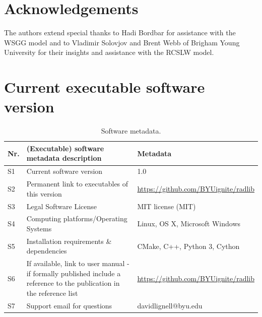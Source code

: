 \documentclass[preprint,12pt, a4paper]{elsarticle}
\begin{document}

\section*{Acknowledgements} \label{sec:acknowledgements}

The authors extend special thanks to Hadi Bordbar for assistance with the WSGG model and to Vladimir Solovjov and Brent Webb of Brigham Young University for their insights and assistance with the RCSLW model. 


 
 


\section*{Current executable software version} \label{s:current_software}


\begin{table}[!h]
\begin{tabular}{|l|p{6.5cm}|p{6.5cm}|}
\hline
\textbf{Nr.} & \textbf{(Executable) software metadata description} & \textbf{Metadata} \\
\hline
S1 & Current software version & 1.0 \\
\hline
S2 & Permanent link to executables of this version  & \href{https://github.com/BYUignite/radlib}{https://github.com/BYUignite/radlib} \\
\hline
S3 & Legal Software License & MIT license (MIT) \\
\hline
S4 & Computing platforms/Operating Systems & Linux, OS X, Microsoft Windows\\
\hline
S5 & Installation requirements \& dependencies & CMake, C++, Python 3, Cython \\
\hline
S6 & If available, link to user manual - if formally published include a reference to the publication in the reference
    list & \href{https://github.com/BYUignite/radlib}{https://github.com/BYUignite/radlib} \\
\hline
S7 & Support email for questions & davidlignell@byu.edu \\
\hline
\end{tabular}
\caption{Software metadata.}
\label{} 
\end{table}
\end{document}
